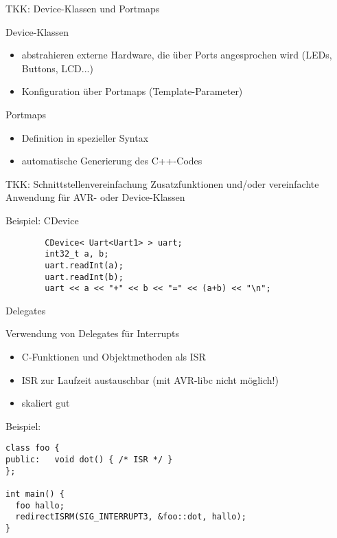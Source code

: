 \documentclass[11pt]{beamer}
\begin{document}
\begin{frame}[fragile]{TKK: Device-Klassen und Portmaps}

	\begin{block}{Device-Klassen}
		\begin{itemize}
			\item abstrahieren externe Hardware, die über Ports angesprochen wird (LEDs, Buttons, LCD...)
			\item Konfiguration über Portmaps (Template-Parameter)
		\end{itemize}
	\end{block}
 
	\begin{block}{Portmaps}
		\begin{itemize}
			\item Definition in spezieller Syntax
			\item automatische Generierung des C++-Codes
		\end{itemize}
	\end{block}

\end{frame}


\begin{frame}[fragile]{TKK: Schnittstellenvereinfachung}
	Zusatzfunktionen und/oder vereinfachte Anwendung für AVR- oder Device-Klassen

\begin{block}{Beispiel: CDevice}
	\begin{lstlisting}
		CDevice< Uart<Uart1> > uart;
		int32_t a, b;
		uart.readInt(a);
		uart.readInt(b);
		uart << a << "+" << b << "=" << (a+b) << "\n";
	\end{lstlisting}
\end{block}

\end{frame}



\begin{frame}[fragile]{Delegates}

	Verwendung von Delegates für Interrupts

	\begin{itemize}
		\item C-Funktionen und Objektmethoden als ISR
		\item ISR zur Laufzeit austauschbar (mit AVR-libc nicht möglich!)
		\item skaliert gut
	\end{itemize}

\begin{block}{Beispiel:}
	\begin{lstlisting}
class foo {
public:   void dot() { /* ISR */ }
};

int main() {
  foo hallo;
  redirectISRM(SIG_INTERRUPT3, &foo::dot, hallo);
}
	\end{lstlisting}
\end{block}

\end{frame}
\end{document}
